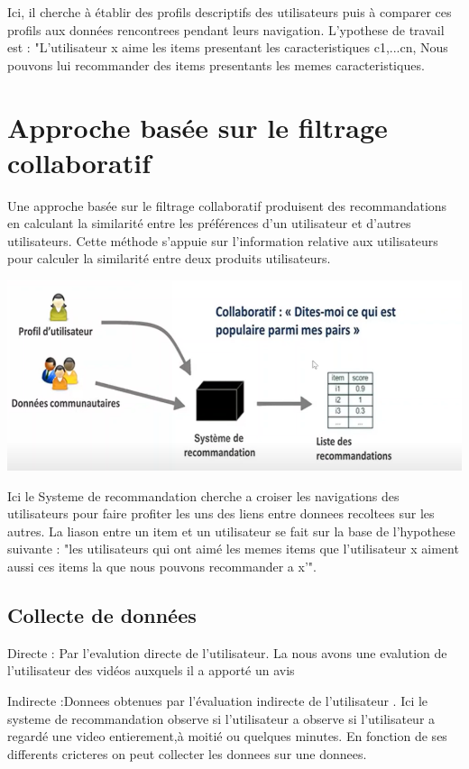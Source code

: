 \documentclass[12pt,a4paper]{article}
\begin{document}
Ici, il cherche à établir des profils descriptifs des utilisateurs puis à comparer ces profils aux données rencontrees pendant leurs navigation. L'ypothese de travail est : "L'utilisateur x aime les items presentant les caracteristiques {c1,...cn}, Nous pouvons lui recommander des items presentants les memes caracteristiques.




\section{Approche basée sur le filtrage collaboratif }	
Une approche basée sur le filtrage collaboratif produisent des recommandations en calculant la similarité entre les préférences d'un utilisateur et d'autres utilisateurs. Cette méthode s'appuie sur l'information relative aux utilisateurs pour calculer la similarité entre deux produits utilisateurs.

\includegraphics[width=2\linewidth]{Capture2}




 Ici le Systeme de recommandation cherche a croiser les navigations des utilisateurs pour faire profiter les uns des liens entre donnees recoltees sur les autres. La liason entre un item et un utilisateur se fait sur la base de l'hypothese suivante : "les utilisateurs qui ont aimé les memes items que l'utilisateur x aiment aussi ces items la que nous pouvons recommander a x'".
 
 \subsection{Collecte de données}
 Directe : Par l'evalution directe de l'utilisateur. La nous avons une evalution de l'utilisateur des vidéos auxquels il a apporté un avis
 
Indirecte :Donnees obtenues par l'évaluation indirecte de l'utilisateur . Ici le systeme de recommandation observe si l'utilisateur a observe si l'utilisateur a regardé une video entierement,à moitié ou quelques minutes. En fonction de ses differents cricteres on peut collecter les donnees sur une donnees.
\end{document}
